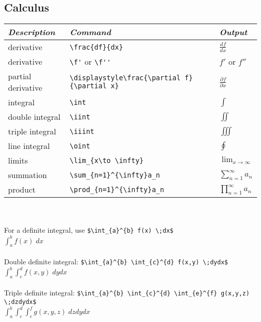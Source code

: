 \documentclass[12pt]{article}
\theoremstyle{definition}
\begin{document}
\subsection{Calculus}
\renewcommand{\arraystretch}{1.3} %
\begin{tabular}{| l | l | l |} \hline
\textit{Description} & \textit{Command} & \textit{Output}\\ \hline
derivative & \verb!\frac{df}{dx}! & $\displaystyle \frac{df}{dx}$\\ \hline  %
derivative & \verb!\f'! or \verb!\f''! & $f'$ or $f''$\\ \hline
partial derivative & \verb!\displaystyle\frac{\partial f}{\partial x}! & $ \displaystyle\frac{\partial f}{\partial x}$\\ \hline
integral & \verb!\int! & $\displaystyle\int$\\ \hline
double integral & \verb!\iint! & $\displaystyle\iint$\\ \hline
triple integral & \verb!\iiint! & $\displaystyle\iiint$\\ \hline
line integral & \verb!\oint! & $\displaystyle\oint$\\ \hline
limits & \verb!\lim_{x\to \infty}! & $\displaystyle \lim_{x\to \infty}$\\ \hline
summation  & 
\verb!\sum_{n=1}^{\infty}a_n! &
$\displaystyle \sum_{n=1}^{\infty}a_n$\\ \hline
product  & 
\verb!\prod_{n=1}^{\infty}a_n! &
$\displaystyle \prod_{n=1}^{\infty}a_n$ \\ \hline
\end{tabular}\\ \\
For a definite integral, use \verb!$\int_{a}^{b} f(x) \;dx$! \\ $\int_{a}^{b} f(x) \;dx$ \\ \\
Double definite integral:  \verb!$\int_{a}^{b} \int_{c}^{d} f(x,y) \;dydx$!\\ $\int_{a}^{b} \int_{c}^{d} f(x,y) \;dydx$ \\ \\
Triple definite integral:  \verb!$\int_{a}^{b} \int_{c}^{d} \int_{e}^{f} g(x,y,z) \;dzdydx$! \\ $\int_{a}^{b} \int_{c}^{d} \int_{e}^{f} g(x,y,z) \;dzdydx$ \\ \\
\end{document}
